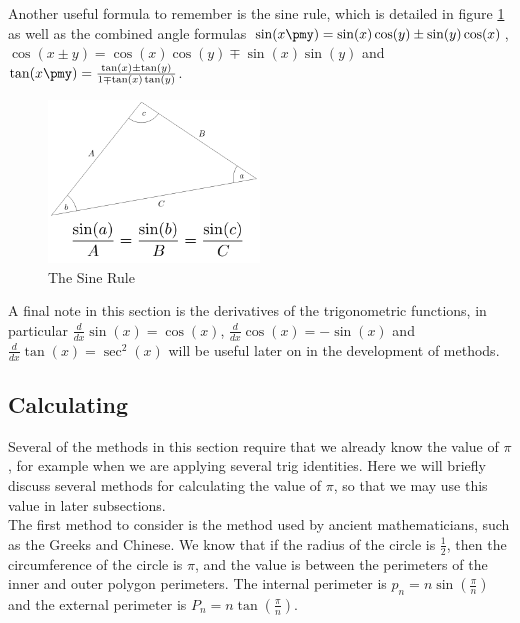 Another useful formula to remember is the sine rule, which is detailed in figure \ref{FIG_"Sine Rule"} as well as the combined angle formulas \(\sin(x\pmy) = \sin(x)\cos(y) \pm \sin(y)\cos(x)\), \(\cos(x \pm y) = \cos(x)\cos(y) \mp \sin(x)\sin(y)\) and \(\tan(x\pmy) = \frac{\tan(x) \pm \tan(y)}{1 \mp \tan(x)\tan(y)}\).
	
\begin{figure}[!ht]
	\label{FIG_"Sine Rule"}
	\caption{The Sine Rule}
	\centering
	\includegraphics[width=0.5\textwidth]{"./Diagrams/Sine Rule Diagram"}
\end{figure}

A final note in this section is the derivatives of the trigonometric functions, in particular \(\frac{d}{dx}\sin(x) = \cos(x)\), \(\frac{d}{dx}\cos(x) = -\sin(x)\) and \(\frac{d}{dx}\tan(x) = \sec^2(x)\) will be useful later on in the development of methods.

\subsection{Calculating \pi}
\label{SUB_"Calculating pi"}

Several of the methods in this section require that we already know the value of \(\pi\), for example when we are applying several trig identities. Here we will briefly discuss several methods for calculating the value of \(\pi\), so that we may use this value in later subsections.\\

The first method to consider is the method used by ancient mathematicians, such as the Greeks and Chinese. We know that if the radius of the circle is \(\frac{1}{2}\), then the circumference of the circle is \(\pi\), and the value is between the perimeters of the inner and outer polygon perimeters. The internal perimeter is \(p_n = n\sin(\frac{\pi}{n})\) and the external perimeter is \(P_n = n\tan(\frac{\pi}{n})\).

